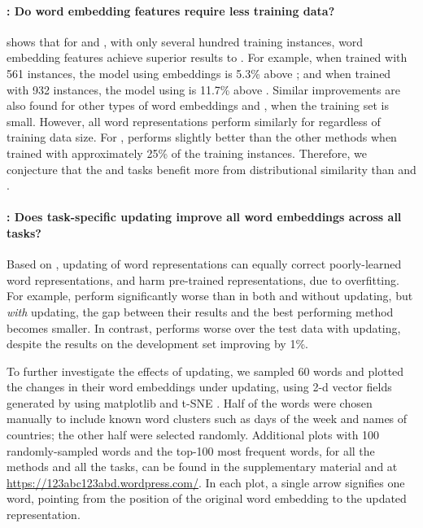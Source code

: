 \paragraph{\RQ[2]: Do word embedding features require less training data?}
 shows that for \pos and \ner, with only several hundred training instances, 
word embedding features achieve superior results to \unigram. 
For example, when trained with 561 instances, the \pos model using \Skipgram[\withup] embeddings is 5.3\% above
\unigram; and when trained with 932 instances, the \ner model using \Skipgram is 11.7\% above \unigram. 
Similar improvements are also found for other types of word embeddings and \brown, when the training set is small. 
However, all word representations perform similarly for \chunking
regardless of training data size.
For \mwe, \brown performs slightly better than the other methods when
trained with approximately 25\% of the training instances. 
Therefore, we conjecture that the \pos and \ner tasks benefit more from
distributional similarity than \chunking and \mwe.

\paragraph{\RQ[3]: Does task-specific updating improve all word embeddings across all tasks?}
Based on , updating of word representations can
equally correct poorly-learned word representations, and harm
pre-trained representations, due to overfitting.
For example, %
\Glove perform significantly worse than \Skipgram
in both \pos and \ner without updating, but \emph{with} updating, the
gap between their results and the best performing method becomes
smaller. In contrast, \Skipgram performs worse over the test data with
updating, despite the results on the development set improving by 1\%.

To further investigate the effects of updating, we sampled 60 words and
plotted the changes in their word embeddings under updating, using 2-d
vector fields generated by using matplotlib and t-SNE \cite{vanderMaaten:Hinton:2008}. Half
of the words were chosen manually to include known word clusters such as
days of the week and names of countries; the other half were selected
randomly. Additional plots with 100 randomly-sampled words and the
top-100 most frequent words, for all the methods and all the tasks, can
be found in the supplementary material and at
\url{https://123abc123abd.wordpress.com/}.  In each plot, a single arrow
signifies one word, pointing from the position of the original word embedding to the updated representation.

